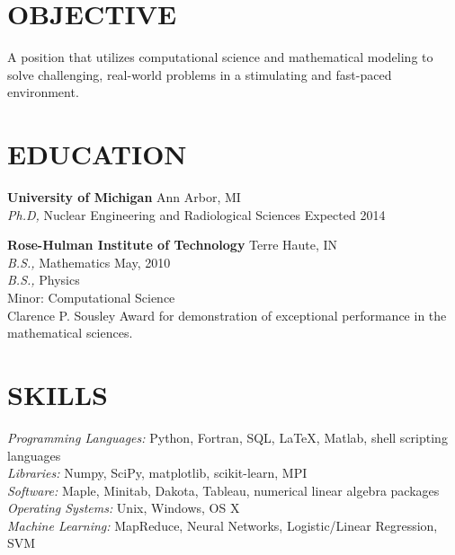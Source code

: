 \documentclass[margin, 10pt]{res} %
\begin{document}
\begin{resume}

 
\section{OBJECTIVE}  

A position that utilizes computational science and mathematical modeling to solve challenging, real-world problems in a stimulating and fast-paced environment.    


\section{EDUCATION}

\textbf{University of Michigan} \hfill Ann Arbor, MI \\
{\sl Ph.D,} Nuclear Engineering and Radiological Sciences \hfill Expected 2014

\textbf{Rose-Hulman Institute of Technology} \hfill Terre Haute, IN \\
{\sl B.S.,} Mathematics \hfill May, 2010 \\
{\sl B.S.,} Physics \\
Minor: Computational Science \\
Clarence P. Sousley Award for demonstration of exceptional performance in the mathematical sciences.
 

\section{SKILLS} 

{\sl Programming Languages:} Python, Fortran, SQL, \LaTeX, Matlab, shell scripting languages \\
{\sl Libraries:} Numpy, SciPy, matplotlib, scikit-learn, MPI \\
{\sl Software:} Maple, Minitab, Dakota, Tableau, numerical linear algebra packages \\
{\sl Operating Systems:} Unix, Windows, OS X \\
{\sl Machine Learning:} MapReduce, Neural Networks, Logistic/Linear Regression, SVM
 

\end{resume}
\end{document}
